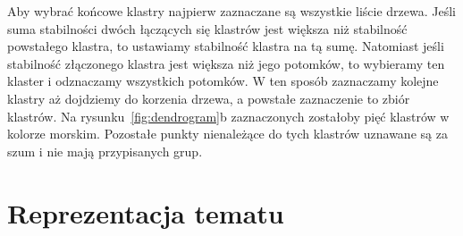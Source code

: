 	Aby wybrać końcowe klastry najpierw zaznaczane są wszystkie liście drzewa.
	Jeśli suma stabilności dwóch łączących się klastrów jest większa niż stabilność powstałego klastra, 
		to ustawiamy stabilność klastra na tą sumę.
	Natomiast jeśli stabilność złączonego klastra jest większa niż jego potomków, to wybieramy ten klaster i odznaczamy wszystkich potomków.
	W ten sposób zaznaczamy kolejne klastry aż dojdziemy do korzenia drzewa, a powstałe zaznaczenie to zbiór klastrów.
	Na rysunku~\ref{fig:dendrogram}b zaznaczonych zostałoby pięć klastrów w kolorze morskim.
	Pozostałe punkty nienależące do tych klastrów uznawane są za szum i nie mają przypisanych grup.

\section{Reprezentacja tematu}
	
